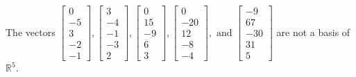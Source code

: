 \begin{exercise}
\begin{exerciseStatement}
  \end{exerciseStatement}
  \begin{exerciseAnswer}
   The vectors \(\left[\begin{array}{r}
0 \\
-5 \\
3 \\
-2 \\
-1
\end{array}\right] , \left[\begin{array}{r}
3 \\
-4 \\
-1 \\
-3 \\
2
\end{array}\right] , \left[\begin{array}{r}
0 \\
15 \\
-9 \\
6 \\
3
\end{array}\right] , \left[\begin{array}{r}
0 \\
-20 \\
12 \\
-8 \\
-4
\end{array}\right] , \text{ and } \left[\begin{array}{r}
-9 \\
67 \\
-30 \\
31 \\
5
\end{array}\right]\) 
  	 are not  a basis of \(\mathbb{R}^5\).
  


  \end{exerciseAnswer}
\end{exercise}